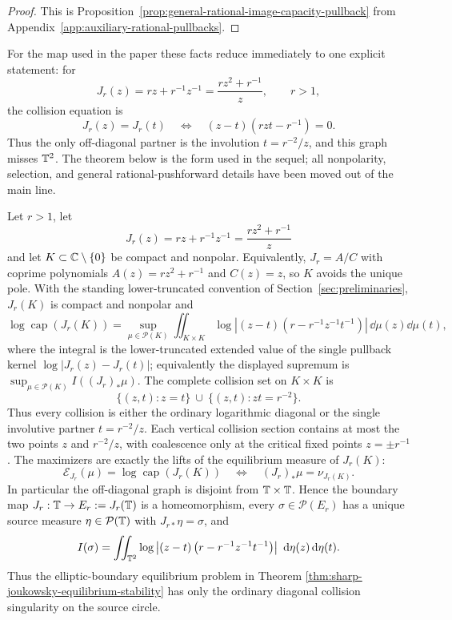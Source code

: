 \begin{proof}
This is Proposition~\ref{prop:general-rational-image-capacity-pullback}
from Appendix~\ref{app:auxiliary-rational-pullbacks}.
\end{proof}

For the map used in the paper these facts reduce immediately to one
explicit statement: for
\[
J_r(z)=rz+r^{-1}z^{-1}=\frac{rz^2+r^{-1}}{z},\qquad r>1,
\]
the collision equation is
\[
J_r(z)=J_r(t)\quad\Longleftrightarrow\quad (z-t)(rzt-r^{-1})=0.
\]
Thus the only off-diagonal partner is the involution
\(t=r^{-2}/z\), and this graph misses \(\mathbb{T}^2\).  The theorem below is
the form used in the sequel; all nonpolarity, selection, and general
rational-pushforward details have been moved out of the main line.
\begin{theorem}\label{thm:degree-two-joukowsky-capacity-collision-relation}
Let \(r>1\), let
\[
J_r(z)=rz+r^{-1}z^{-1}=\frac{rz^2+r^{-1}}{z}
\]
  and let \(K\subset\mathbb{C}\setminus\{0\}\) be compact and nonpolar.  Equivalently, \(J_r=A/C\) with coprime polynomials \(A(z)=rz^2+r^{-1}\) and \(C(z)=z\), so \(K\) avoids the unique pole.  With the standing lower-truncated convention of Section~\ref{sec:preliminaries}, \(J_r(K)\) is compact and nonpolar and
\[
\log\operatorname{cap}(J_r(K))
=\sup_{\mu\in\mathcal P(K)}\iint_{K\times K}\log\left|(z-t)\left(r-r^{-1}z^{-1}t^{-1}\right)\right|\,
\dd\mu(z)\dd\mu(t),
\]
where the integral is the lower-truncated extended value of the single pullback kernel \(\log|J_r(z)-J_r(t)|\); equivalently the displayed supremum is \(\sup_{\mu\in\mathcal P(K)}I((J_r)_\ast\mu)\).  The complete collision set on \(K\times K\) is
\[
\{(z,t):z=t\}\ \cup\ \{(z,t):zt=r^{-2}\}.
\]
Thus every collision is either the ordinary logarithmic diagonal or the single involutive partner \(t=r^{-2}/z\).  Each vertical collision section contains at most the two points \(z\) and \(r^{-2}/z\), with coalescence only at the critical fixed points \(z=\pm r^{-1}\).  The maximizers are exactly the lifts of the equilibrium measure of \(J_r(K)\):
\[
\mathcal E_{J_r}(\mu)=\log\operatorname{cap}(J_r(K))
\quad\Longleftrightarrow\quad
(J_r)_\ast\mu=\nu_{J_r(K)}.
\]
In particular the off-diagonal graph is disjoint from \(\mathbb{T}\times\mathbb{T}\).  Hence the boundary map \(J_r:\mathbb{T}\to E_r:=J_r(\mathbb{T})\) is a homeomorphism, every \(\sigma\in\mathcal P(E_r)\) has a unique source measure \(\eta\in\mathcal P(\mathbb{T})\) with \(J_{r\ast}\eta=\sigma\), and
\[
I(\sigma)=
\iint_{\mathbb{T}^2}
\log\left|(z-t)\left(r-r^{-1}z^{-1}t^{-1}\right)\right|
\,\,\mathrm{d}\eta(z)\,\mathrm{d}\eta(t).
\]
Thus the elliptic-boundary equilibrium problem in Theorem \ref{thm:sharp-joukowsky-equilibrium-stability} has only the ordinary diagonal collision singularity on the source circle.


\end{theorem}
